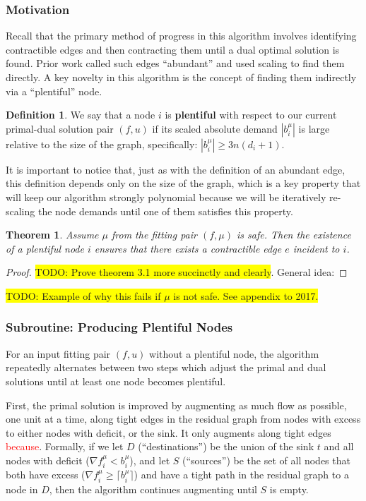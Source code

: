 \documentclass[12pt]{article}
\newtheorem{theorem}{Theorem}[section]
\theoremstyle{definition}
\newtheorem{definition}{Definition}[section]
\newcommand{\rewrite}[1]{\textcolor{red}{#1}}
\newcommand{\todo}[1]{\colorbox{yellow}{TODO: #1}}
\begin{document}
\subsubsection{Motivation}

Recall that the primary method of progress in this algorithm involves
identifying contractible edges and then contracting them until a dual optimal
solution is found. Prior work called such edges ``abundant'' and used scaling to
find them directly. A key novelty in this algorithm is the concept of finding
them indirectly via a ``plentiful'' node. 
\begin{definition}
We say that a node $i$ is \textbf{plentiful} with respect
to our current primal-dual solution pair $(f,u)$ if its scaled absolute
demand $|b_i^{\mu}|$ is large relative to the size of the graph, specifically:
$|b_i^{\mu}| \ge 3n(d_i + 1)$.
\end{definition}

It is important to notice that, just as with the definition of an abundant  edge,
this definition depends only on the size of the graph, which is a key property
that will keep our algorithm strongly polynomial because we will be iteratively
re-scaling the node demands until one of them satisfies this property.

\begin{theorem} Assume $\mu$ from the fitting pair $(f,\mu)$ is safe.
Then the existence of a plentiful node $i$ ensures
that there exists a contractible edge $e$ incident to $i$.
\end{theorem}
\begin{proof}
\todo{Prove theorem 3.1 more succinctly and clearly}. General idea: 
\end{proof}
\todo{Example of why this fails if $\mu$ is not safe. See appendix to 2017.}

\subsubsection{Subroutine: Producing Plentiful Nodes}
\label{sec:sub-ppn}

For an input fitting pair $(f,u)$ without a plentiful node, the algorithm
repeatedly alternates between two steps which adjust the primal and dual
solutions until at least one node becomes plentiful.

First, the primal solution is improved by augmenting as much flow as possible,
one unit at a time, along tight edges in the residual graph 
from nodes with excess to either nodes with deficit, or the sink.
It only augments along tight edges \rewrite{because}. Formally, if we let
$D$ (``destinations'') be the union of the sink $t$ and all nodes with 
deficit ($\nabla f_i^{\mu} < b_i^{\mu}$), and let $S$ (``sources'') be
the set of all nodes that both have excess ($\nabla f_i^{\mu} \ge \lceil b_i^{\mu} \rceil$)
and have a tight path in the residual graph to a node in $D$, then the algorithm
continues augmenting until $S$ is empty.
\end{document}
